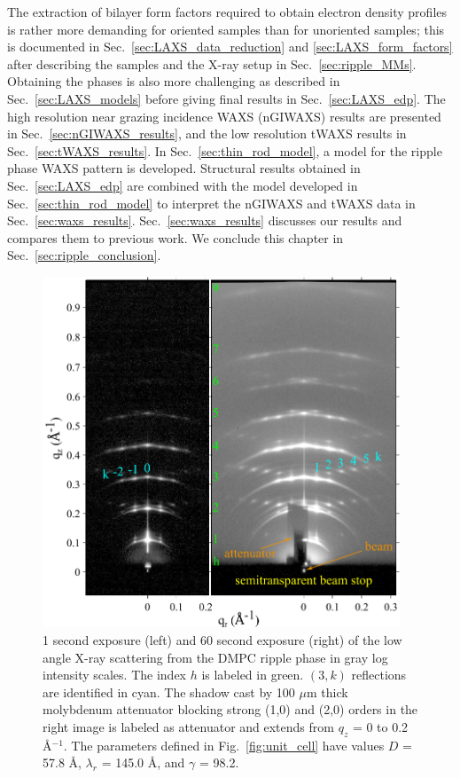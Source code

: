 The extraction of bilayer form factors required to obtain electron density 
profiles is rather more demanding for oriented samples than for unoriented 
samples; this is documented in Sec.~\ref{sec:LAXS_data_reduction} 
and \ref{sec:LAXS_form_factors} after describing the samples 
and the X-ray setup in Sec.~\ref{sec:ripple_MMs}.  
Obtaining the phases is also more 
challenging as described in Sec.~\ref{sec:LAXS_models} before giving final results in 
Sec.~\ref{sec:LAXS_edp}.  
The high resolution near grazing incidence WAXS (nGIWAXS) results are presented 
in Sec.~\ref{sec:nGIWAXS_results},
and the low resolution tWAXS results in Sec.~\ref{sec:tWAXS_results}.
In Sec.~\ref{sec:thin_rod_model}, a model for the ripple phase WAXS pattern 
is developed.
Structural results obtained in Sec.~\ref{sec:LAXS_edp} are combined with the model 
developed in Sec.~\ref{sec:thin_rod_model} to interpret the nGIWAXS and tWAXS data
in Sec.~\ref{sec:waxs_results}. 
Sec.~\ref{sec:waxs_results} discusses our results and compares them to previous work.
We conclude this chapter in Sec.~\ref{sec:ripple_conclusion}.

\begin{figure}[htbp]
  \centering
  \includegraphics[width=0.95\textwidth]{figures/ripple/ripple083and085}
  \caption[1 second exposure (left) and 60 second exposure (right) of the low
  angle X-ray scattering from the DMPC ripple phase in gray log intensity scales]
  {1 second exposure (left) and 60 second exposure (right) of the low
  angle X-ray scattering from the DMPC ripple phase in gray log intensity scales. 
  The index $h$ is 
  labeled in green. $(3,k)$ reflections are identified in cyan. 
  The shadow cast by 100 $\mu$m thick molybdenum attenuator blocking
  strong (1,0) and (2,0) orders in the right image is labeled as attenuator
  and extends from $q_z$ = 0 to 0.2 \AA$^{-1}$.
  The parameters defined in Fig.~\ref{fig:unit_cell} have values
  $D$ = 57.8 \AA, $\lambda_r$ = 145.0 \AA, and $\gamma$ = 98.2\textdegree.}
  \label{fig:ripple_laxs_images}  
\end{figure} 


